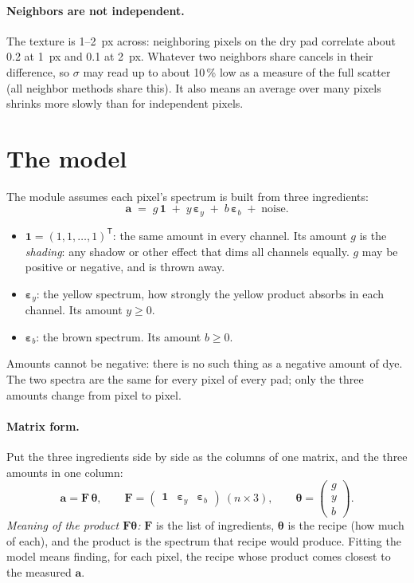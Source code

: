 \documentclass[11pt,letterpaper]{article}
\newcommand{\va}{\mathbf{a}}
\newcommand{\vone}{\mathbf{1}}
\newcommand{\epsy}{\bm{\varepsilon}_y}
\newcommand{\epsb}{\bm{\varepsilon}_b}
\newcommand{\mF}{\mathbf{F}}
\newcommand{\T}{^{\mathsf{T}}}
\begin{document}
\paragraph{Neighbors are not independent.}  The texture is 1--2~px across:
neighboring pixels on the dry pad correlate about 0.2 at 1~px and 0.1 at
2~px.  Whatever two neighbors share cancels in their difference, so
$\sigma$ may read up to about 10\,\% low as a measure of the full scatter
(all neighbor methods share this).  It also means an average over many
pixels shrinks more slowly than for independent pixels.

\section{The model}
\label{sec:model}

The module assumes each pixel's spectrum is built from three ingredients:
\begin{equation}
\va \;=\; g\,\vone \;+\; y\,\epsy \;+\; b\,\epsb \;+\; \text{noise}.
\label{eq:model}
\end{equation}
\begin{itemize}[nosep]
\item $\vone = (1,1,\dots,1)\T$: the same amount in every channel.  Its
  amount $g$ is the \emph{shading}: any shadow or other effect that dims all
  channels equally.  $g$ may be positive or negative, and is thrown away.
\item $\epsy$: the yellow spectrum, how strongly the yellow product absorbs
  in each channel.  Its amount $y \ge 0$.
\item $\epsb$: the brown spectrum.  Its amount $b \ge 0$.
\end{itemize}
Amounts cannot be negative: there is no such thing as a negative amount of
dye.  The two spectra are the same for every pixel of every pad; only the
three amounts change from pixel to pixel.

\paragraph{Matrix form.}  Put the three ingredients side by side as the
columns of one matrix, and the three amounts in one column:
\begin{equation}
\va = \mF\,\bm\theta,\qquad
\mF = \begin{pmatrix} \vone & \epsy & \epsb \end{pmatrix}\ (n \times 3),
\qquad
\bm\theta = \begin{pmatrix} g \\ y \\ b \end{pmatrix}.
\label{eq:modelmatrix}
\end{equation}
\emph{Meaning of the product $\mF\bm\theta$:} $\mF$ is the list of
ingredients, $\bm\theta$ is the recipe (how much of each), and the product
is the spectrum that recipe would produce.  Fitting the model means finding,
for each pixel, the recipe whose product comes closest to the measured
$\va$.
\end{document}
